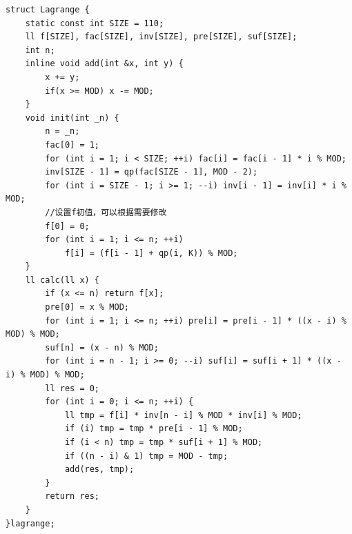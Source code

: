 \documentclass[a4paper,11pt,twoside,fontset = fandol,UTF8]{ctexbook} %
\begin{document}
	\begin{lstlisting}
struct Lagrange {
	static const int SIZE = 110;
	ll f[SIZE], fac[SIZE], inv[SIZE], pre[SIZE], suf[SIZE];
	int n;
	inline void add(int &x, int y) {
		x += y;
		if(x >= MOD) x -= MOD;
	}
	void init(int _n) {
		n = _n;
		fac[0] = 1;
		for (int i = 1; i < SIZE; ++i) fac[i] = fac[i - 1] * i % MOD;
	    inv[SIZE - 1] = qp(fac[SIZE - 1], MOD - 2);
		for (int i = SIZE - 1; i >= 1; --i) inv[i - 1] = inv[i] * i % MOD;
		//设置f初值，可以根据需要修改
		f[0] = 0;
		for (int i = 1; i <= n; ++i)
			f[i] = (f[i - 1] + qp(i, K)) % MOD;
	}
	ll calc(ll x) {
		if (x <= n) return f[x];
		pre[0] = x % MOD;
		for (int i = 1; i <= n; ++i) pre[i] = pre[i - 1] * ((x - i) % MOD) % MOD;
		suf[n] = (x - n) % MOD;
		for (int i = n - 1; i >= 0; --i) suf[i] = suf[i + 1] * ((x - i) % MOD) % MOD;
		ll res = 0;
		for (int i = 0; i <= n; ++i) {
			ll tmp = f[i] * inv[n - i] % MOD * inv[i] % MOD;
			if (i) tmp = tmp * pre[i - 1] % MOD;
			if (i < n) tmp = tmp * suf[i + 1] % MOD;
			if ((n - i) & 1) tmp = MOD - tmp;
			add(res, tmp);
		}
		return res;
	}
}lagrange;
	\end{lstlisting}
\end{document}
